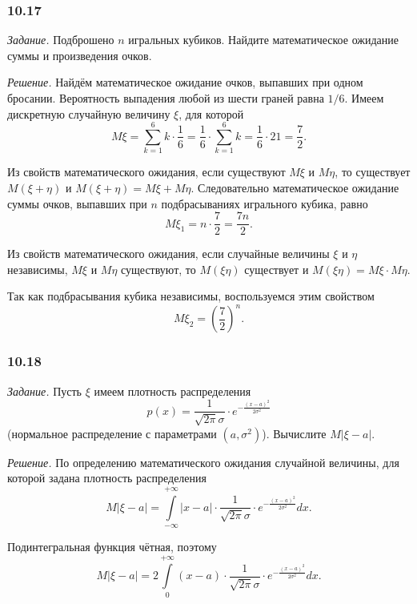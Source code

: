 \subsubsection*{10.17}

\textit{Задание.} Подброшено $n$ игральных кубиков.
Найдите математическое ожидание суммы и произведения очков.

\textit{Решение.} Найдём математическое ожидание очков, выпавших при одном бросании.
Вероятность выпадения любой из шести граней равна $1/6$.
Имеем дискретную случайную величину $ \xi $, для которой
$$M \xi =
\sum \limits_{k=1}^6 k \cdot \frac{1}{6} =
\frac{1}{6} \cdot \sum \limits_{k=1}^6 k =
\frac{1}{6} \cdot 21 =
\frac{7}{2}.$$

Из свойств математического ожидания, если существуют $M \xi $ и $M \eta $, то существует $M \left( \xi + \eta \right) $ и $M \left( \xi + \eta \right) = M \xi + M \eta $.
Следовательно математическое ожидание суммы очков, выпавших при $n$ подбрасываниях игрального кубика, равно
$$M \xi_1 =
n \cdot \frac{7}{2} =
\frac{7n}{2}.$$

Из свойств математического ожидания,
если случайные величины $ \xi $ и $ \eta $ независимы,
$M \xi $ и $M \eta $ существуют, то $M \left( \xi \eta \right) $ существует и $M \left( \xi \eta \right) = M \xi \cdot M \eta $.

Так как подбрасывания кубика независимы, воспользуемся этим свойством
$$M \xi_2 =
\left( \frac{7}{2} \right)^n.$$

\subsubsection*{10.18}

\textit{Задание.} Пусть $ \xi $ имеем плотность распределения
$$p \left( x \right) =
\frac{1}{ \sqrt{2 \pi } \sigma } \cdot e^{- \frac{ \left( x-a \right)^2}{2 \sigma^2}}$$
(нормальное распределение с параметрами $ \left( a, \sigma^2 \right) $).
Вычислите $ M \left| \xi - a \right| $.

\textit{Решение.} По определению математического ожидания случайной величины, для которой задана плотность распределения
$$M \left| \xi - a \right| =
\int \limits_{- \infty }^{+ \infty } \left| x - a \right| \cdot \frac{1}{ \sqrt{2 \pi } \sigma } \cdot e^{- \frac{ \left( x - a \right)^2}{2 \sigma^2}} dx.$$

Подинтегральная функция чётная, поэтому
$$M \left| \xi - a \right| =
2 \int \limits_0^{+ \infty } \left( x - a \right) \cdot \frac{1}{ \sqrt{2 \pi } \sigma } \cdot e^{- \frac{ \left( x - a \right)^2}{2 \sigma^2}} dx.$$

